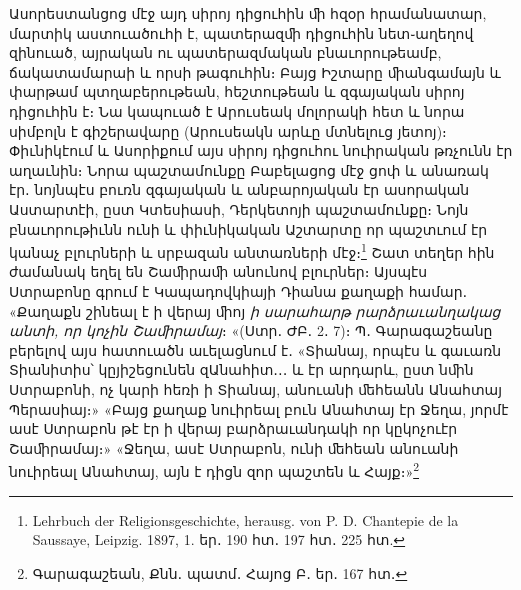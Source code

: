 \documentclass{article}
\begin{document}
{Ասորեստանցոց մէջ այդ սիրոյ դիցուհին ﬕ հզօր հրամանատար, մարտիկ աստուածուհի է, պատերազﬕ դիցուհին նետ֊աղեղով զինուած, այրական ու պատերազմական բնաւորութեամբ, ճակատամարաի և որսի թագուհին։ Բայց Իշտարը ﬕանգամայն և փարթամ պտղաբերութեան, հեշտութեան և զգայական սիրոյ դիցուհին է։ Նա կապուած է Արուսեակ մոլորակի հետ և նորա սիմբոլն է գիշերավարը (Արուսեակն արևը մտնելուց յետոյ)։ Փիւնիկէում և Ասորիքում այս սիրոյ դիցուհու նուիրական թռչունն էր աղաւնին։ Նորա պաշտամունքը Բաբելացոց մէջ ցոփ և անառակ էր․ նոյնպէս բուռն զգայական և անբարոյական էր ասորական Աստարտէի, ըստ Կտեսիասի, Դերկետոյի պաշտամունքը։ Նոյն բնաւորութիւնն ունի և փիւնիկական Աշտարտը որ պաշտւում էր կանաչ բլուրների և սրբազան անտառների մէջ։\footnote{Lehrbuch der Religionsgeschichte, herausg. von P. D. Chantepie de la Saussaye, Leipzig. 1897, 1. եր․ 190 հտ․ 197 հտ․ 225 հտ.} Շատ տեղեր հին ժամանակ եղել են Շաﬕրաﬕ անունով բլուրներ։ Այսպէս Ստրաբոնը գրում է Կապադովկիայի Դիանա քաղաքի համար․ «Քաղաքն շինեալ է ի վերայ ﬕոյ \emph{ի սարահարթ րարձրաւանղակաց անտի, որ կոչին Շաﬕրամայ}։ «(Ստր․ ԺԲ․ 2․ 7)։ Պ․ Գարագաշեանը բերելով այս հատուածն աւելացնում է․ «Տիանայ, որպէս և գաւառն Տիանիտիս՝ կըյիշեցունեն զԱնահիտ․․․ և էր արդարև, ըստ նﬕն Ստրաբոնի, ոչ կարի հեռի ի Տիանայ, անուանի ﬔհեանն Անահտայ Պերասիայ։» «Բայց քաղաք նուիրեալ բուն Անահտայ էր Ջեղա, յորմէ ասէ Ստրաբոն թէ էր ի վերայ բարձրաւանդակի որ կըկոչուէր Շաﬕրամայ։» «Ջեղա, ասէ Ստրաբոն, ունի ﬔհեան անուանի նուիրեալ Անահտայ, այն է դիցն զոր պաշտեն և Հայք։»\footnote{Գարագաշեան, Քնն․ պատմ․ Հայոց Բ․ եր․ 167 հտ․}

}
\end{document}
